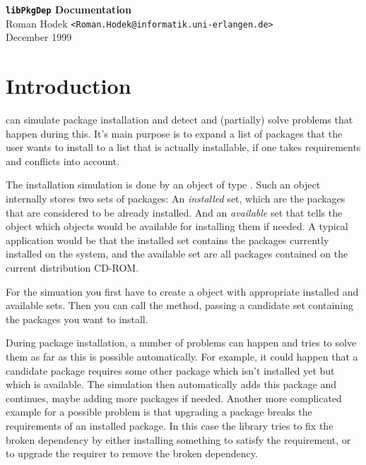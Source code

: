 \documentclass[10pt]{article}
\begin{document}
\begin{center}
{\Large\bf
\texttt{libPkgDep} Documentation \\[\baselineskip]
}
{\large
Roman Hodek \texttt{<Roman.Hodek@informatik.uni-erlangen.de>} \\
December 1999
}
\end{center}
\vspace{1cm}

\tableofcontents
\newpage




\section{Introduction}

 can simulate package installation and detect and
(partially) solve problems that happen during this. It's main purpose
is to expand a list of packages that the user wants to install to a
list that is actually installable, if one takes requirements and
conflicts into account.

The installation simulation is done by an object of type
. Such an object internally stores two sets of packages:
An {\em installed} set, which are the packages that are considered to
be already installed. And an {\em available} set that tells the object
which objects would be available for installing them if needed. A
typical application would be that the installed set contains the
packages currently installed on the system, and the available set are
all packages contained on the current distribution CD-ROM.

For the simuation you first have to create a  object
with appropriate installed and available sets. Then you can call the
 method, passing a candidate set containing the packages
you want to install.

During package installation, a number of problems can happen and
 tries to solve them as far as this is possible
automatically. For example, it could happen that a candidate package
requires some other package which isn't installed yet but which is
available. The simulation then automatically adds this package and
continues, maybe adding more packages if needed. Another more
complicated example for a possible problem is that upgrading a package
breaks the requirements of an installed package. In this case the
library tries to fix the broken dependency by either installing
something to satisfy the requirement, or to upgrade the requirer to
remove the broken dependency.
\end{document}
